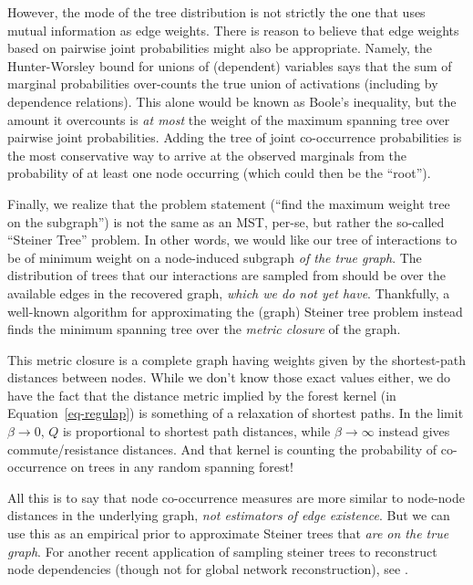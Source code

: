 \documentclass[%
	12pt,
		oneside,
		letterpaper
]{book}
\begin{document}
However, the mode of the tree distribution is not strictly the one that uses mutual information as edge weights.
There is reason to believe that edge weights based on pairwise joint probabilities might also be appropriate.
Namely, the Hunter-Worsley bound for unions of (dependent) variables says that the sum of marginal probabilities over-counts the true union of activations (including by dependence relations).
This alone would be known as Boole's inequality, but the amount it overcounts is \emph{at most} the weight of the maximum spanning tree over pairwise joint probabilities.\autocite{upperboundprobability_Hunter1976}
Adding the tree of joint co-occurrence probabilities is the most conservative way to arrive at the observed marginals from the probability of at least one node occurring (which could then be the ``root'').

Finally, we realize that the problem statement (``find the maximum weight tree on the subgraph'') is not the same as an MST, per-se, but rather the so-called ``Steiner Tree'' problem.
In other words, we would like our tree of interactions to be of minimum weight on a node-induced subgraph \emph{of the true graph}.
The distribution of trees that our interactions are sampled from should be over the available edges in the recovered graph, \emph{which we do not yet have}.
Thankfully, a well-known algorithm for approximating the (graph) Steiner tree problem instead finds the minimum spanning tree over the \emph{metric closure} of the graph.\autocite{fastalgorithmSteiner_Kou1981}

This metric closure is a complete graph having weights given by the shortest-path distances between nodes.
While we don't know those exact values either, we do have the fact that the distance metric implied by the forest kernel (in Equation~\ref{eq-regulap}) is something of a relaxation of shortest paths.
In the limit \(\beta\rightarrow 0\), \(Q\) is proportional to shortest path distances, while \(\beta\rightarrow\infty\) instead gives commute/resistance distances.\autocite{Semisupervisedlearning_Avrachenkov2017}
And that kernel is counting the probability of co-occurrence on trees in any random spanning forest!

All this is to say that node co-occurrence measures are more similar to node-node distances in the underlying graph, \emph{not estimators of edge existence}.
But we can use this as an empirical prior to approximate Steiner trees that \emph{are on the true graph}.
For another recent application of sampling steiner trees to reconstruct node dependencies (though not for global network reconstruction), see \textcite{RobustCascadeReconstruction_Xiao2018}.
\end{document}
